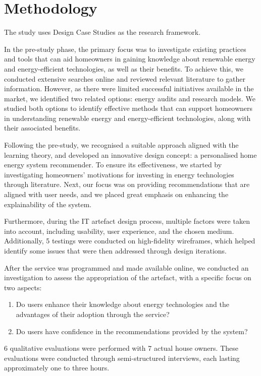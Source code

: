 \chapter{Methodology} 

The study uses Design Case Studies \cite{dcs} as the research framework. 

In the pre-study phase, 
the primary focus was to investigate existing practices and tools that can aid homeowners in gaining knowledge about renewable energy and energy-efficient technologies, as well as their benefits. 
To achieve this, we conducted extensive searches online and reviewed relevant literature to gather information. 
However, as there were limited successful initiatives available in the market, we identified two related options: energy audits and research models. 
We studied both options to identify effective methods that can support homeowners in understanding renewable energy and energy-efficient technologies, along with their associated benefits.

Following the pre-study, 
we recognised a suitable approach aligned with the learning theory, 
and developed an innovative design concept: a personalised home energy system recommender.
To ensure its effectiveness, 
we started by investigating homeowners' motivations for investing in energy technologies through literature. 
Next, our focus was on providing recommendations that are aligned with user needs, 
and we placed great emphasis on enhancing the explainability of the system.

Furthermore, during the IT artefact design process, 
multiple factors were taken into account, including usability, user experience, and the chosen medium. 
Additionally, 5 testings were conducted on high-fidelity wireframes, 
which helped identify some issues that were then addressed through design iterations. 

After the service was programmed and made available online, 
we conducted an investigation to assess the appropriation of the artefact,
with a specific focus on two aspects:
\begin{enumerate}
    \item Do users enhance their knowledge about energy technologies and the advantages of their adoption through the service?
    \item Do users have confidence in the recommendations provided by the system?
\end{enumerate}
6 qualitative evaluations were performed with 7 actual house owners. 
These evaluations were conducted through semi-structured interviews, 
each lasting approximately one to three hours. 

